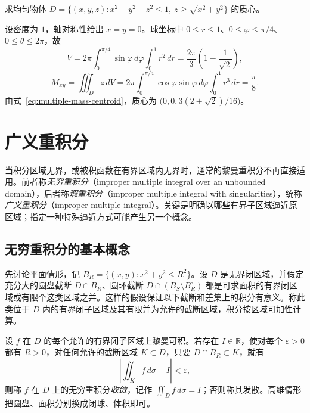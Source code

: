 \documentclass[UTF8,12pt,a4paper,fontset=fandol]{ctexbook}
\begin{document}
\begin{example}
\label{ex:multiple-spherical-cone-centroid}
求均匀物体 $D=\{(x,y,z):x^2+y^2+z^2\leq1,\ z\geq\sqrt{x^2+y^2}\}$ 的质心。
\end{example}
\begin{solve}
设密度为 $1$，轴对称性给出 $\overline x=\overline y=0$。球坐标中 $0\leq r\leq1$、$0\leq\varphi\leq\pi/4$、$0\leq\theta\leq2\pi$，故
\[
    V=2\pi\int_0^{\pi/4}\sin\varphi\,d\varphi\int_0^1r^2\,dr
    =\frac{2\pi}{3}\left(1-\frac1{\sqrt2}\right),
\]
\[
    M_{xy}=\iiint_Dz\,dV
    =2\pi\int_0^{\pi/4}\cos\varphi\sin\varphi\,d\varphi\int_0^1r^3\,dr
    =\frac\pi8.
\]
由式~\eqref{eq:multiple-mass-centroid}，质心为 $\bigl(0,0,3(2+\sqrt2)/16\bigr)$。
\end{solve}

\section{广义重积分}
\label{sec:improper-multiple-integrals}

当积分区域无界，或被积函数在有界区域内无界时，通常的黎曼重积分不再直接适用。前者称\emph{无穷重积分}（improper multiple integral over an unbounded domain），后者称\emph{瑕重积分}（improper multiple integral with singularities），统称\emph{广义重积分}（improper multiple integral）。关键是明确以哪些有界子区域逼近原区域；指定一种特殊逼近方式可能产生另一个概念。

\subsection{无穷重积分的基本概念}
\label{subsec:basic-concepts-of-infinite-multiple-integrals}

先讨论平面情形，记 $B_R=\{(x,y):x^2+y^2\leq R^2\}$。设 $D$ 是无界闭区域，并假定充分大的圆盘截断 $D\cap B_R$、圆环截断 $D\cap(B_S\setminus B_R^\circ)$ 都是可求面积的有界闭区域或有限个这类区域之并。这样的假设保证以下截断和差集上的积分有意义。称此类位于 $D$ 内的有界闭子区域及其有限并为允许的截断区域，积分按区域可加性计算。

\begin{definition}
\label{def:multiple-improper-at-infinity}
设 $f$ 在 $D$ 的每个允许的有界闭子区域上黎曼可积。若存在 $I\in\mathbb R$，使对每个 $\varepsilon>0$ 都有 $R>0$，对任何允许的截断区域 $K\subset D$，只要 $D\cap B_R\subset K$，就有
\begin{equation}
    \left|\iint_Kf\,d\sigma-I\right|<\varepsilon,
    \label{eq:multiple-improper-unrestricted-limit}
\end{equation}
则称 $f$ 在 $D$ 上的无穷重积分\emph{收敛}，记作 $\iint_Df\,d\sigma=I$；否则称其发散。高维情形把圆盘、面积分别换成闭球、体积即可。
\end{definition}
\end{document}
